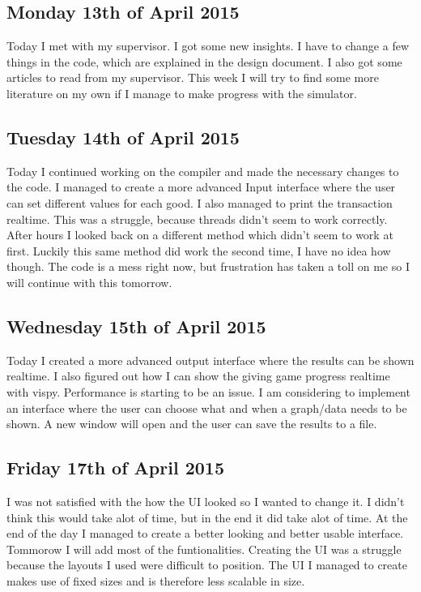 \documentclass{article}
\begin{document}
\subsection{Monday 13th of April 2015}
Today I met with my supervisor. I got some new insights. I have to change a few things in the code, which are explained in the design document. I also got some articles to read from my supervisor. This week I will try to find some more literature on my own if I manage to make progress with the simulator.

\subsection{Tuesday 14th of April 2015}
Today I continued working on the compiler and made the necessary changes to the code. I managed to create a more advanced Input interface where the user can set different values for each good. I also managed to print the transaction realtime. This was a struggle, because threads didn't seem to work correctly. After hours I looked back on a different method which didn't seem to work at first. Luckily this same method did work the second time, I have no idea how though. The code is a mess right now, but frustration has taken a toll on me so I will continue with this tomorrow.

\subsection{Wednesday 15th of April 2015}
Today I created a more advanced output interface where the results can be shown realtime. I also figured out how I can show the giving game progress realtime with vispy. Performance is starting to be an issue. I am considering to implement an interface where the user can choose what and when a graph/data needs to be shown. A new window will open and the user can save the results to a file. 

\subsection{Friday 17th of April 2015}
I was not satisfied with the how the UI looked so I wanted to change it. I didn't think this would take alot of time, but in the end it did take alot of time. At the end of the day I managed to create a better looking and better usable interface. Tommorow I will add most of the funtionalities.
Creating the UI was a struggle because the layouts I used were difficult to position. The UI I managed to create makes use of fixed sizes and is therefore less scalable in size.
\end{document}
